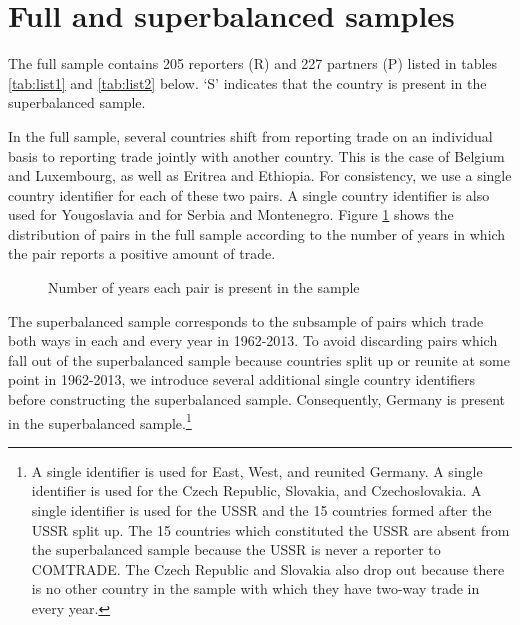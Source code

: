 \documentclass[12pt,twoside,a4paper,notitlepage]{article}
\newcommand{\revLA}[1]{\textcolor{red}{\footnotesize\textit{{revLA: #1}}}} %
\def\revLA #1{} %
\begin{document}
%

%


\clearpage
\appendix
\revLA{I updated numbers in the text and graphs by defining the superbalanced sample for 1962-2013.}
\section{Full and superbalanced samples} \label{app:E}
The full sample contains 205 reporters (R) and 227 partners (P) listed in tables \ref{tab:list1} and \ref{tab:list2} below.
`S' indicates that the country is present in the superbalanced sample.


In the full sample, several countries shift from reporting trade on an individual basis to reporting trade jointly with another country.
This is the case of Belgium and Luxembourg, as well as Eritrea and Ethiopia.
For consistency, we use a single country identifier for each of these two pairs.
A single country identifier is also used for Yougoslavia and for Serbia and Montenegro.
Figure \ref{fig:pairpresence} shows the distribution of pairs in the full sample according to the number of years in which the pair reports a positive amount of trade.

\begin{figure}[h!]
\begin{center}
\setlength{\fboxrule}{1pt} %
\setlength{\fboxsep}{.1in} %
\end{center}
\caption{Number of years each pair is present in the sample \label{fig:pairpresence}}
\end{figure}

The superbalanced sample corresponds to the subsample of pairs which trade both ways in each and every year in 1962-2013.
To avoid discarding pairs which fall out of the superbalanced sample because countries split up or reunite at some point in 1962-2013, we introduce several additional single country identifiers before constructing the superbalanced sample.
Consequently, Germany is present in the superbalanced sample.\footnote{A single identifier is used for East, West, and reunited Germany.
A single identifier is used for the Czech Republic, Slovakia, and Czechoslovakia.
A single identifier is used for the USSR and the 15 countries formed after the USSR split up.
The 15 countries which constituted the USSR are absent from the superbalanced sample because the USSR is never a reporter to COMTRADE.
The Czech Republic and Slovakia also drop out because there is no other country in the sample with which they have two-way trade in every year.} 
\end{document}
